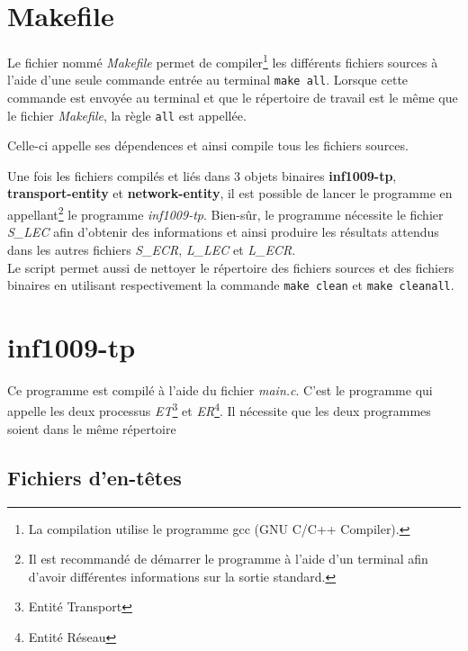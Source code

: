 \documentclass[11pt,french]{article}
\begin{document}
    \lstset{language=make}
    \section{Makefile} %
    \label{sec:makefile}
        Le fichier nommé \emph{Makefile} permet de compiler\footnote{La compilation utilise le programme
        gcc (GNU C/C++ Compiler).} les différents fichiers sources
        à l'aide d'une seule commande entrée au terminal \texttt{make all}. Lorsque cette commande
        est envoyée au terminal et que le répertoire de travail est le même que le fichier \emph{Makefile},
        la règle \texttt{all} est appellée.
        
        Celle-ci appelle ses dépendences et ainsi compile tous les 
        fichiers sources.
        

        Une fois les fichiers compilés et liés dans 3 objets binaires
        {\bf inf1009-tp}, {\bf transport-entity} et {\bf network-entity},
        il est possible de lancer le programme en appellant\footnote{Il est recommandé de
        démarrer le programme à l'aide d'un terminal afin d'avoir différentes informations sur
        la sortie standard.} le programme \emph{inf1009-tp}.
        Bien-sûr, le programme nécessite le fichier \emph{S\_LEC} afin d'obtenir des informations et
        ainsi produire les résultats attendus dans les autres fichiers \emph{S\_ECR}, \emph{L\_LEC}
        et \emph{L\_ECR}.\\

        Le script permet aussi de nettoyer le répertoire des fichiers sources et des fichiers binaires
        en utilisant respectivement la commande \texttt{make clean} et \texttt{make cleanall}.
        
    
    \lstset{language=c}
    
    \section{inf1009-tp} %
    \label{sec:inf1009-tp}
        Ce programme est compilé à l'aide du fichier \emph{main.c}. C'est le programme qui appelle
        les deux processus \emph{ET}\footnote{Entité Transport} et \emph{ER}\footnote{Entité Réseau}. Il nécessite
        que les deux programmes soient dans le même répertoire
        
        \subsection{Fichiers d'en-têtes} %
        \label{sub:fich-entete}
            
\end{document}
